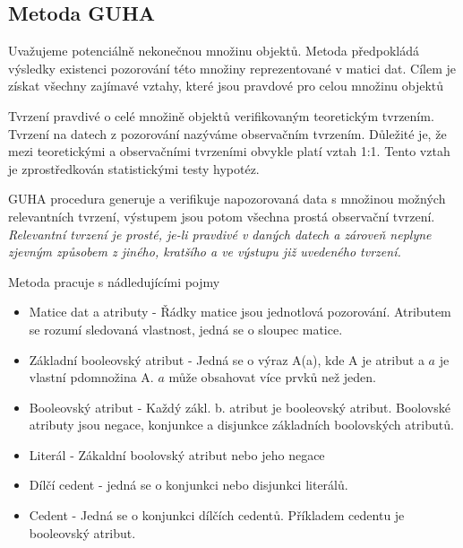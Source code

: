 


\subsection{Metoda GUHA}

Uvažujeme potenciálně nekonečnou množinu objektů. Metoda předpokládá výsledky existenci pozorování této množiny reprezentované v matici dat. Cílem je získat všechny zajímavé vztahy, které jsou pravdové pro celou množinu objektů

Tvrzení pravdivé o celé množině objektů verifikovaným teoretickým tvrzením. Tvrzení na datech z pozorování nazýváme observačním tvrzením. Důležité je, že mezi teoretickými a observačními tvrzeními obvykle platí vztah 1:1. Tento vztah je zprostředkován statistickými testy hypotéz.

GUHA procedura generuje a verifikuje napozorovaná data s množinou možných relevantních tvrzení, výstupem jsou potom všechna prostá observační tvrzení. \textit{Relevantní tvrzení je prosté, je-li pravdivé v daných datech a zároveň neplyne zjevným způsobem z jiného, kratšího a ve výstupu již uvedeného tvrzení.} %

Metoda pracuje s nádledujícími pojmy

\begin{itemize}
    \item Matice dat a atributy - Řádky matice jsou jednotlová pozorování. Atributem se rozumí sledovaná vlastnost, jedná se o sloupec matice.
    \item Základní booleovský atribut - Jedná se o výraz A(a), kde A je atribut a $a$ je vlastní pdomnožina A. $a$ může obsahovat více prvků než jeden.
    \item Booleovský atribut -  Každý zákl. b. atribut je booleovský atribut. Boolovské atributy jsou negace, konjunkce a disjunkce základních boolovských atributů.
    \item Literál - Zákaldní boolovský atribut nebo jeho negace
    \item Dílčí cedent - jedná se o konjunkci nebo disjunkci literálů.
    \item Cedent - Jedná se o konjunkci dílčích cedentů. Příkladem cedentu je booleovský atribut.
\end{itemize}

